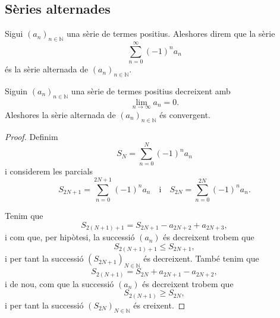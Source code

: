 \documentclass[../../Main.tex]{subfiles}
\begin{document}
	\subsection{Sèries alternades}
	\begin{definition}
		\label{def:sèrie alternada}
		Sigui \((a_{n})_{n\in\mathbb{N}}\) una sèrie de termes positius. Aleshores direm que la sèrie
		\[\sum_{n=0}^{\infty}(-1)^{n}a_{n}\]
		és la sèrie alternada de \((a_{n})_{n\in\mathbb{N}}\).
	\end{definition}
	\begin{theorem}
		\label{thm:criteri de Leibniz per sèries alternades}
		Siguin \((a_{n})_{n\in\mathbb{N}}\) una sèrie de termes positius decreixent amb 
		\[\lim_{n\to\infty}a_{n}=0.\]
		Aleshores la sèrie alternada de \((a_{n})_{n\in\mathbb{N}}\) és convergent.
		\begin{proof}
			Definim
			\begin{equation}
				\label{thm:criteri de Leibniz per sèries alternades:eq1}
				S_{N}=\sum_{n=0}^{N}(-1)^{n}a_{n}
			\end{equation}
			i considerem les parcials
			\[S_{2N+1}=\sum_{n=0}^{2N+1}(-1)^{n}a_{n}\quad\text{i}\quad S_{2N}=\sum_{n=0}^{2N}(-1)^{n}a_{n}.\]
			
			Tenim que
			\[S_{2(N+1)+1}=S_{2N+1}-a_{2N+2}+a_{2N+3},\]
			i com que, per hipòtesi, la successió \((a_{n})\) és decreixent trobem que
			\[S_{2(N+1)+1}\leq S_{2N+1},\]
			i per tant la successió \((S_{2N+1})_{N\in\mathbb{N}}\) és decreixent. També tenim que
			\[S_{2(N+1)}=S_{2N}+a_{2N+1}-a_{2N+2},\]
			i de nou, com que la successió \((a_{n})\) és decreixent trobem que
			\[S_{2(N+1)}\geq S_{2N},\]
			i per tant la successió \((S_{2N})_{N\in\mathbb{N}}\) és creixent.
			

\end{proof}
\end{theorem}
\end{document}
